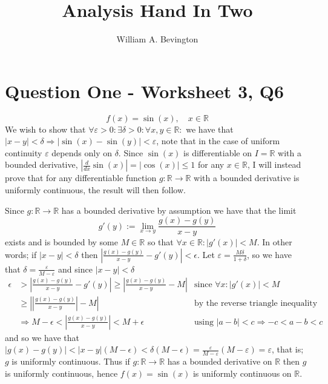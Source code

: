 \documentclass{article}
\author{William A. Bevington}
\title{Analysis Hand In Two}
\date{}
\def \R {\mathbb{R}}
\begin{document}
\maketitle
\section*{Question One - Worksheet 3, Q6}
	\begin{equation}\label{eqn:q1}
		f(x) = \sin(x),\quad x\in\R
	\end{equation}
We wish to show that $\forall\varepsilon>0: \exists\delta>0: \forall x,y\in\R:$ we have that $|x-y|<\delta \Rightarrow |\sin(x)-\sin(y)|<\varepsilon$, note that in the case of uniform continuity  $\varepsilon$ depends only on $\delta$. Since $\sin(x)$ is differentiable on $I=\R$ with a bounded derivative, $\left|\frac{d}{dx}\sin(x)\right| = |\cos(x)| \leq 1$ for any $x\in\R$, I will instead prove that for any differentiable function $g:\R\to\R$ with a bounded derivative is uniformly continuous, the result will then follow.

Since $g:\R\to\R$ has a bounded derivative by assumption we have that the limit
	\begin{equation}\label{eqn:q1}
		g'(y) := \lim_{x\to y} \frac{g(x)-g(y)}{x-y}
	\end{equation}
exists and is bounded by some $M\in\R$ so that $\forall x\in\R: |g'(x)|<M$. In other words; if $|x-y|<\delta$ then $\left|\frac{g(x)-g(y)}{x-y}-g'(y)\right|<\epsilon$. Let $\varepsilon = \frac{M\delta}{1+\delta}$, so we have that $\delta = \frac{\varepsilon}{M-\varepsilon}$ and since $|x-y|<\delta$ 
	\begin{align*}
		\epsilon
		&>\left| \frac{g(x)-g(y)}{x-y}-g'(y)  \right|
		\geq \left| \frac{g(x)-g(y)}{x-y} - M \right|
			&\text{since $\forall x: |g'(x)|<M$}\\
		&\geq \left|\left|\frac{g(x)-g(y)}{x-y}\right|-M\right|
			&\text{by the reverse triangle inequality}\\
		&\Rightarrow M-\epsilon < \left|\frac{g(x)-g(y)}{x-y}\right|<M+\epsilon
			&\text{using $|a-b|<c \Rightarrow -c<a-b<c$}
	\end{align*}
and so we have that $|g(x)-g(y)| < |x-y|(M-\epsilon)< \delta(M-\epsilon) = \frac{\varepsilon}{M-\varepsilon}(M-\varepsilon) = \varepsilon$, that is; $g$ is uniformly continuous. Thus if $g:\R\to\R$ has a bounded derivative on $\R$ then $g$ is uniformly continuous, hence $f(x)=\sin(x)$ is uniformly continuous on $\R$.
\end{document}
